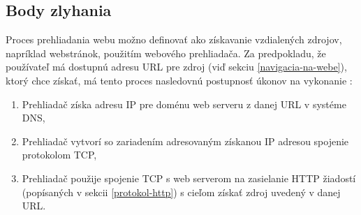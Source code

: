 \subsection{Body zlyhania}
\label{body-zlyhania}

Proces prehliadania webu možno definovať ako získavanie vzdialených zdrojov, napríklad webstránok, použitím webového prehliadača.
Za predpokladu, že používateľ má dostupnú adresu URL pre zdroj (viď sekciu \ref{navigacia-na-webe}), 
ktorý chce získať, má tento proces nasledovnú postupnosť úkonov na vykonanie \cite{nel-client-side-measurement-e2e-reliability, mdn-docs-how-browser-works}:

\begin{enumerate}
    \item Prehliadač získa adresu IP pre doménu web serveru z danej URL v systéme DNS,
    
    \item Prehliadač vytvorí so zariadením adresovaným získanou IP adresou spojenie protokolom TCP,
    
    \item Prehliadač použije spojenie TCP s web serverom na zasielanie HTTP žiadostí 
    (popísaných v sekcii \ref{protokol-http}) s cieľom získať zdroj uvedený v danej URL.
\end{enumerate}


